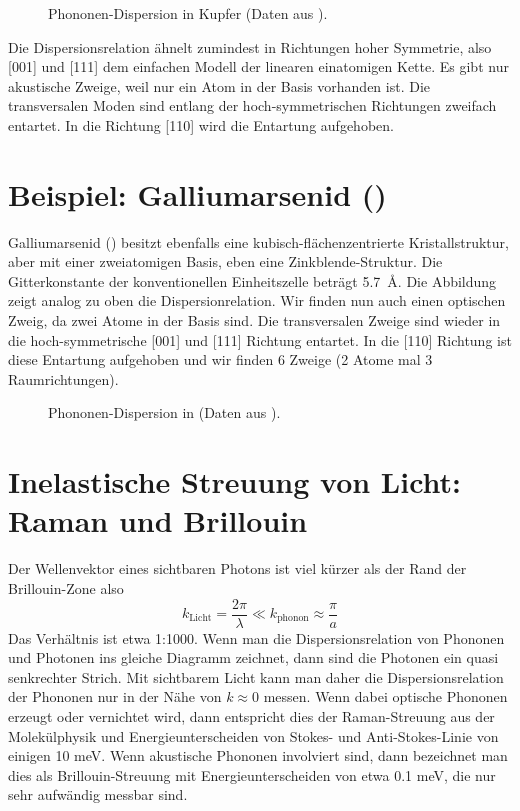 	\begin{figure}
\caption{Phononen-Dispersion in Kupfer (Daten aus \cite{Svensson_cu}). \label{fig:phonon_kupfer}}
\end{figure}

Die Dispersionsrelation ähnelt zumindest in Richtungen hoher Symmetrie, also [001] und [111]	dem einfachen Modell der linearen einatomigen Kette. Es gibt nur akustische Zweige, weil nur ein Atom in der Basis vorhanden ist. Die transversalen Moden sind entlang der hoch-symmetrischen Richtungen zweifach entartet. In die Richtung [110] wird die Entartung aufgehoben.


\section{Beispiel: Galliumarsenid ()}


Galliumarsenid () besitzt ebenfalls eine kubisch-flächenzentrierte Kristallstruktur, aber mit einer zweiatomigen Basis, eben eine Zinkblende-Struktur. Die Gitterkonstante der konventionellen Einheitszelle beträgt 5.7~\AA. Die Abbildung zeigt analog zu oben die Dispersionrelation. Wir finden nun auch einen optischen Zweig, da zwei Atome in der Basis sind. Die transversalen Zweige sind wieder in die hoch-symmetrische [001] und [111] Richtung entartet. In die [110] Richtung ist diese Entartung aufgehoben und wir finden 6 Zweige (2 Atome mal 3 Raumrichtungen).


\begin{figure}
\caption{Phononen-Dispersion in  (Daten aus \cite{Strauch_gaas}).}
\end{figure}



\section{Inelastische Streuung von Licht: Raman und Brillouin}

Der Wellenvektor eines sichtbaren Photons ist viel kürzer als der Rand der Brillouin-Zone also
\begin{equation}
 k_\text{Licht} = \frac{2 \pi}{\lambda} \ll k_\text{phonon} \approx \frac{\pi}{a}
\end{equation}
Das Verhältnis ist etwa 1:1000. Wenn man die Dispersionsrelation von Phononen und Photonen ins gleiche Diagramm zeichnet, dann sind die Photonen ein quasi senkrechter Strich. Mit sichtbarem Licht kann man daher die Dispersionsrelation der Phononen nur in der Nähe von $k \approx 0$ messen. Wenn dabei optische Phononen erzeugt oder vernichtet wird, dann entspricht dies der Raman-Streuung aus der Molekülphysik und Energieunterscheiden von Stokes- und Anti-Stokes-Linie von einigen 10 meV. Wenn akustische Phononen involviert sind, dann bezeichnet man dies als Brillouin-Streuung mit Energieunterscheiden von etwa 0.1 meV, die nur sehr aufwändig messbar sind.


